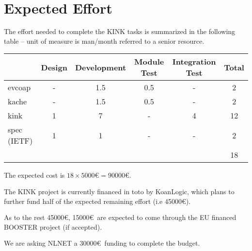 \documentclass[12pt]{article}
\begin{document}
\section{Expected Effort}
The effort needed to complete the KINK tasks is summarized in the following table -- unit of measure is man/month referred to a senior resource.

\begin{center}
\begin{tabular}{|l|c|c|c|c|c|}
	\hline 
	  & Design & Development & Module Test & Integration Test & Total \\
	\hline 
	evcoap & - & 1.5 & 0.5 & - & 2 \\
	\hline
	kache & - & 1.5 & 0.5 & - & 2 \\
	\hline
	kink & 1 & 7 & - & 4 & 12 \\
	\hline
	spec (IETF) & 1 & 1 & - & - & 2 \\
	\hline
	\multicolumn{5}{|c|}{} & 18 \\
	\hline
\end{tabular}
\end{center}

The expected cost is $18 \times 5000$\euro $= 90000$\euro. 

The KINK project is currently financed in toto by KoanLogic, which plans to further fund half of the expected remaining effort (i.e 45000\euro).

As to the rest 45000\euro, 15000\euro~are expected to come through the EU financed BOOSTER project (if accepted).

We are asking NLNET a 30000\euro~funding to complete the budget.
\end{document}
